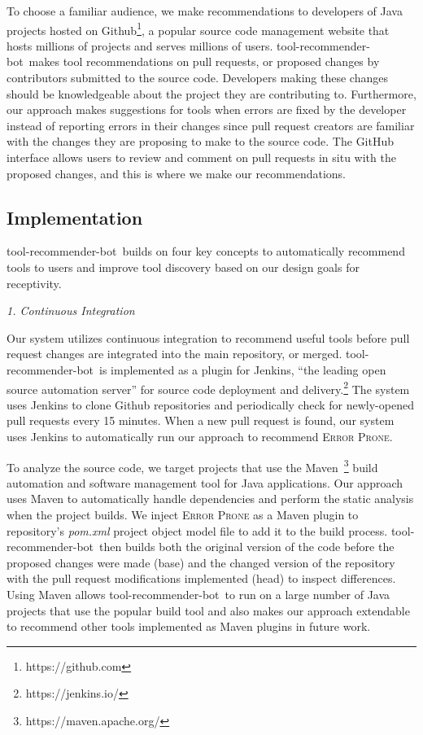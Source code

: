 \documentclass[conference]{IEEEtran}
\newcommand{\tool}{tool-recommender-bot}
\newcommand{\pseudosubsection}[1]{\vspace{2mm} {\it #1}}
\begin{document}
To choose a familiar audience, we make recommendations to developers of Java projects hosted on Github\footnote{https://github.com}, a popular source code management website that hosts millions of projects and serves millions of users. \tool~makes tool recommendations on pull requests, or proposed changes by contributors submitted to the source code. Developers making these changes should be knowledgeable about the project they are contributing to. Furthermore, our approach makes suggestions for tools when errors are fixed by the developer instead of reporting errors in their changes since pull request creators are familiar with the changes they are proposing to make to the source code. The GitHub interface allows users to review and comment on pull requests in situ with the proposed changes, and this is where we make our recommendations.

\subsection{Implementation}

\tool~builds on four key concepts to automatically recommend tools to users and improve tool discovery based on our design goals for receptivity.

\pseudosubsection{1. Continuous Integration}

Our system utilizes continuous integration to recommend useful tools before pull request changes are integrated into the main repository, or merged. \tool~is implemented as a plugin for Jenkins, ``the leading open source automation server'' for source code deployment and delivery.\footnote{https://jenkins.io/} The system uses Jenkins to clone Github repositories and periodically check for newly-opened pull requests every 15 minutes. When a new pull request is found, our system uses Jenkins to automatically run our approach to recommend \textsc{Error Prone}.

To analyze the source code, we target projects that use the Maven~\footnote{https://maven.apache.org/} build automation and software management tool for Java applications. Our approach uses Maven to automatically handle dependencies and perform the static analysis when the project builds. We inject \textsc{Error Prone} as a Maven plugin to repository's \textit{pom.xml} project object model file to add it to the build process. \tool~then builds both the original version of the code before the proposed changes were made (base) and the changed version of the repository with the pull request modifications implemented (head) to inspect differences. Using Maven allows \tool~to run on a large number of Java projects that use the popular build tool and also makes our approach extendable to recommend other tools implemented as Maven plugins in future work. 
\end{document}
